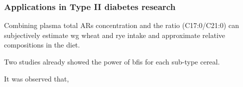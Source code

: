 \begin{table}[h!]
	\caption{Biomarkers of Wheat Intake Reported in Observation study}
	\label{table:wheat_observation}
\end{table}

\subsubsection{Applications in Type II diabetes research}

Combining plasma total ARs concentration and the ratio (C17:0/C21:0) can subjectively estimate \acrshort{wg} wheat and rye intake and approximate relative compositions in the diet.

Two studies already showed the power of \acrshort{bfis} for each sub-type cereal. 

It was observed that, 

